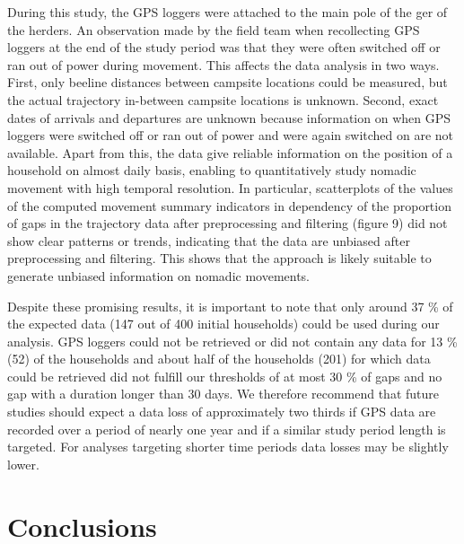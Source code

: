 \documentclass[]{elsarticle} %
\begin{document}
During this study, the GPS loggers were attached to the main pole of the
ger of the herders. An observation made by the field team when
recollecting GPS loggers at the end of the study period was that they
were often switched off or ran out of power during movement. This
affects the data analysis in two ways. First, only beeline distances
between campsite locations could be measured, but the actual trajectory
in-between campsite locations is unknown. Second, exact dates of
arrivals and departures are unknown because information on when GPS
loggers were switched off or ran out of power and were again switched on
are not available. Apart from this, the data give reliable information
on the position of a household on almost daily basis, enabling to
quantitatively study nomadic movement with high temporal resolution. In
particular, scatterplots of the values of the computed movement summary
indicators in dependency of the proportion of gaps in the trajectory
data after preprocessing and filtering (figure 9) did not show clear
patterns or trends, indicating that the data are unbiased after
preprocessing and filtering. This shows that the approach is likely
suitable to generate unbiased information on nomadic movements.

Despite these promising results, it is important to note that only
around 37 \% of the expected data (147 out of 400 initial households)
could be used during our analysis. GPS loggers could not be retrieved or
did not contain any data for 13 \% (52) of the households and about half
of the households (201) for which data could be retrieved did not
fulfill our thresholds of at most 30 \% of gaps and no gap with a
duration longer than 30 days. We therefore recommend that future studies
should expect a data loss of approximately two thirds if GPS data are
recorded over a period of nearly one year and if a similar study period
length is targeted. For analyses targeting shorter time periods data
losses may be slightly lower.

\hypertarget{conclusions}{%
\section{Conclusions}\label{conclusions}}
\end{document}
